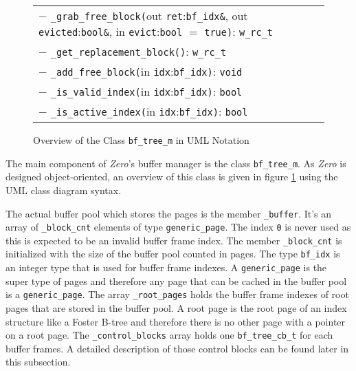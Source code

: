 \begin{@empty}
\begin{figure}[ht!]
{\begin{tabularx}{\textwidth}{|X|}
			$-$ \texttt{\_grab\_free\_block(}out \texttt{ret}:\texttt{bf\_idx\&}, out \texttt{evicted}:\texttt{bool\&}, in \texttt{evict}:\texttt{bool} $=$ \texttt{true)}: \texttt{w\_rc\_t}								\\
			$-$ \texttt{\_get\_replacement\_block()}: \texttt{w\_rc\_t}																											\\
			$-$ \texttt{\_add\_free\_block(}in \texttt{idx}:\texttt{bf\_idx)}: \texttt{void}																								\\
			$-$ \texttt{\_is\_valid\_index(}in \texttt{idx}:\texttt{bf\_idx)}: \texttt{bool}																								\\
			$-$ \texttt{\_is\_active\_index(}in \texttt{idx}:\texttt{bf\_idx)}: \texttt{bool}																								\\	\hline
		\end{tabularx}}
		\caption{Overview of the Class \lstinline{bf_tree_m} in UML Notation}
		\label{fig:bufferdesign}
	\end{figure}
\end{@empty}

	The main component of \emph{Zero}'s buffer manager is the class \lstinline{bf_tree_m}. As \emph{Zero} is designed object-oriented, an overview of this class is given in figure \ref{fig:bufferdesign} using the UML class diagram syntax. 
	
	The actual buffer pool which stores the pages is the member \lstinline{_buffer}. It's an array of \lstinline{_block_cnt} elements of type \lstinline{generic_page}. The index \lstinline{0} is never used as this is expected to be an invalid buffer frame index. The member \lstinline{_block_cnt} is initialized with the size of the buffer pool counted in pages. The type \lstinline{bf_idx} is an integer type that is used for buffer frame indexes. A \lstinline{generic_page} is the super type of pages and therefore any page that can be cached in the buffer pool is a \lstinline{generic_page}. The array \lstinline{_root_pages} holds the buffer frame indexes of root pages that are stored in the buffer pool. A root page is the root page of an index structure like a Foster B-tree and therefore there is no other page with a pointer on a root page. The \lstinline{_control_blocks} array holds one \lstinline{bf_tree_cb_t} for each buffer frames. A detailed description of those control blocks can be found later in this subsection.
	

